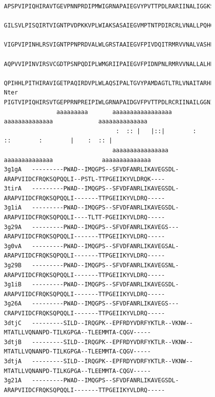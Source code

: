 \documentclass{bmcart}
\begin{document}
\begin{figure}
\centering
\begin{tiny}
\begin{Verbatim}[frame=single]
        APSPVIPIQHIRAVTGEVPNNPRDIPMWIGRNAPAIEGVYPVTTPDLRARIINALIGGKSGIHLTAPEAVTWASAVAAIFTRTHGSFP
        GILSVLPISQIRTVIGNTPVDPKKVPLWIAKSASAIEGVMPTNTPDIRCRLVNALLPQHGGLILQPHECNSWTQIASALYTRVNGMIP
        VIGPVIPINHLRSVIGNTPPNPRDVALWLGRSTAAIEGVFPIVDQITRMRVVNALVASHPGLTLTENEAGSWNAAISALWRKAHGAAA
        AQPVVIPINVIRSVCGDTPSNPQDIPLWMGRIIPAIEGVFPIDNPNLRMRVVNALLALHPGLAITELNAQTWGQVLAVLHMRALGHTA
        QPIHHLPITHIRAVIGETPAQIRDVPLWLAQSIPALTGVYPAMDAGTLTRLVNAITARHPGLALGMNEAGSWHEAVHLIWQRTFGATA
Nter    PIGTVIPIQHIRSVTGEPPRNPREIPIWLGRNAPAIDGVFPVTTPDLRCRIINAILGGNIGLSLTPGDCLTWDSAVATLFIRTHGTFP
               aaaaaaaaa       aaaaaaaaaaaaaaaaa   aaaaaaaaaaaaaa             aaaaaaaaaaaaaa
                                :  :: |   |::|        :    ::        :        |    :  :: |      
                               aaaaaaaaaaaaaaaa   aaaaaaaaaaaaaa              aaaaaaaaaaaaaa
3g1gA   ---------PWAD--IMQGPS--SFVDFANRLIKAVEGSDL-ARAPVIIDCFRQKSQPQQLI--PSTL-TTPGEIIKYVLDRQK----
3tirA   ---------PWAD--IMQGPS--SFVDFANRLIKAVEGSDL-ARAPVIIDCFRQKSQPQQLI-------TTPGEIIKYVLDRQ-----
3g1iA   ---------PWAD--IMQGPS--SFVDFANRLIKAVEGSDL-ARAPVIIDCFRQKSQPQQLI----TLTT-PGEIIKYVLDRQ-----
3g29A   ---------PWAD--IMQGPS--SFVDFANRLIKAVEGS---ARAPVIIDCFRQKSQPQQLI-------TTPGEIIKYVLDRQ-----
3g0vA   ---------PWAD--IMQGPS--SFVDFANRLIKAVEGSAL-ARAPVIIDCFRQKSQPQQLI-------TTPGEIIKYVLDRQ-----
3g29B   ---------PWAD--IMQGPS--SFVDFANRLIKAVEGSNL-ARAPVIIDCFRQKSQPQQLI-------TTPGEIIKYVLDRQ-----
3g1iB   ---------PWAD--IMQGPS--SFVDFANRLIKAVEGSDL-ARAPVIIDCFRQKSQPQQLI-------TTPGEIIKYVLDRQ-----
3g26A   ---------PWAD--IMQGPS--SFVDFANRLIKAVEGS---CRAPVIIDCFRQKSQPQQLI-------TTPGEIIKYVLDRQ-----
3dtjC   ---------SILD--IRQGPK--EPFRDYVDRFYKTLR--VKNW--MTATLLVQNANPD-TILKGPGA--TLEEMMTA-CQGV-----
3dtjB   ---------SILD--IRQGPK--EPFRDYVDRFYKTLR--VKNW--MTATLLVQNANPD-TILKGPGA--TLEEMMTA-CQGV-----
3dtjA   ---------SILD--IRQGPK--EPFRDYVDRFYKTLR--VKNW--MTATLLVQNANPD-TILKGPGA--TLEEMMTA-CQGV-----
3g21A   ---------PWAD--IMQGPS--SFVDFANRLIKAVEGSDL-ARAPVIIDCFRQKSQPQQLI-------TTPGEIIKYVLDRQ-----


\end{Verbatim}
\end{tiny}
\end{figure}
\end{document}
